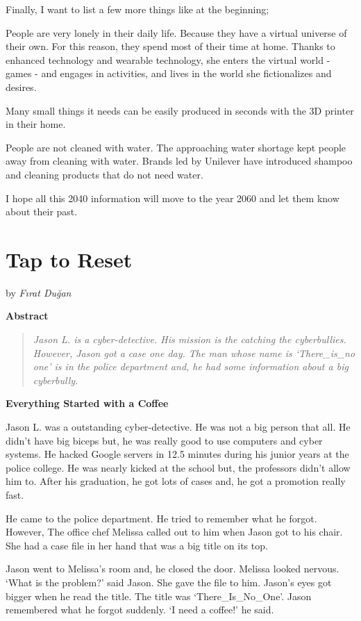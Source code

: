 \documentclass[]{book}
\begin{document}
Finally, I want to list a few more things like at the beginning;

People are very lonely in their daily life. Because they have a virtual universe of their own. For this reason, they spend most of their time at home. Thanks to enhanced technology and wearable technology, she enters the virtual world - games - and engages in activities, and lives in the world she fictionalizes and desires.

Many small things it needs can be easily produced in seconds with the 3D printer in their home.

People are not cleaned with water. The approaching water shortage kept people away from cleaning with water. Brands led by Unilever have introduced shampoo and cleaning products that do not need water.

I hope all this 2040 information will move to the year 2060 and let them know about their past.

\hypertarget{tap-to-reset}{%
\chapter{Tap to Reset}\label{tap-to-reset}}

by \emph{Fırat Duğan}

\textbf{Abstract}

\begin{quote}
\emph{Jason L. is a cyber-detective. His mission is the catching the cyberbullies. However, Jason got a case one day. The man whose name is `There\_is\_no one' is in the police department and, he had some information about a big cyberbully.}
\end{quote}

\textbf{Everything Started with a Coffee}

Jason L. was a outstanding cyber-detective. He was not a big person that all. He didn't have big biceps but, he was really good to use computers and cyber systems. He hacked Google servers in 12.5 minutes during his junior years at the police college. He was nearly kicked at the school but, the professors didn't allow him to. After his graduation, he got lots of cases and, he got a promotion really fast.

He came to the police department. He tried to remember what he forgot. However, The office chef Melissa called out to him when Jason got to his chair. She had a case file in her hand that was a big title on its top.

Jason went to Melissa's room and, he closed the door. Melissa looked nervous. `What is the problem?' said Jason. She gave the file to him. Jason's eyes got bigger when he read the title. The title was `There\_Is\_No\_One'. Jason remembered what he forgot suddenly. `I need a coffee!' he said.
\end{document}
